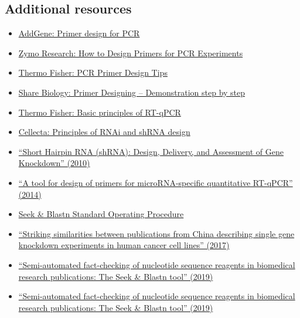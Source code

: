\documentclass[letterpaper, 12pt]{article}
\begin{document}
\subsection*{Additional resources}

\begin{itemize}
    \setlength\itemsep{-0.5em}
    \item \href{https://www.addgene.org/protocols/primer-design/}{AddGene: Primer design for PCR}
    \item \href{https://www.zymoresearch.com/blogs/blog/how-to-design-primers-for-pcr-experiments}{Zymo Research: How to Design Primers for PCR Experiments}
    \item \href{https://www.thermofisher.com/blog/behindthebench/pcr-primer-design-tips/}{Thermo Fisher: PCR Primer Design Tips}
    \item \href{https://sharebiology.com/primer-designing-demonstration-step-by-step/}{Share Biology: Primer Designing – Demonstration step by step}
    \item \href{https://www.thermofisher.com/us/en/home/brands/thermo-scientific/molecular-biology/molecular-biology-learning-center/molecular-biology-resource-library/spotlight-articles/basic-principles-rt-qpcr.html}{Thermo Fisher: Basic principles of RT-qPCR}
    \item \href{https://cellecta.com/pages/principles-of-rnai-and-shrna-design}{Cellecta: Principles of RNAi and shRNA design}
    \item \href{https://doi.org/10.1007/978-1-60761-657-3_10}{``Short Hairpin RNA (shRNA): Design, Delivery, and Assessment of Gene Knockdown'' (2010)}
    \item \href{https://doi.org/10.1186/1471-2105-15-29}{``A tool for design of primers for microRNA-specific quantitative RT-qPCR'' (2014)}
    \item \href{https://dx.doi.org/10.17504/protocols.io.bjhpkj5n}{Seek \& Blastn Standard Operating Procedure}
    \item \href{https://doi.org/10.1007/s11192-016-2209-6}{``Striking similarities between publications from China describing single gene knockdown experiments in human cancer cell lines'' (2017)}
    \item \href{https://doi.org/10.1371/journal.pone.0213266}{``Semi-automated fact-checking of nucleotide sequence reagents in biomedical research publications: The Seek \& Blastn tool'' (2019)}
    \item \href{https://doi.org/10.1371/journal.pone.0213266}{``Semi-automated fact-checking of nucleotide sequence reagents in biomedical research publications: The Seek \& Blastn tool'' (2019)}

\end{itemize}
\end{document}
